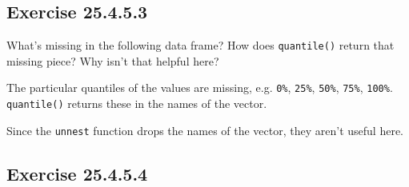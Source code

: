 \documentclass[]{book}
\newenvironment{Shaded}{\begin{snugshade}}{\end{snugshade}}
\newcommand{\CommentTok}[1]{\textcolor[rgb]{0.56,0.35,0.01}{\textit{#1}}}
\newcommand{\DataTypeTok}[1]{\textcolor[rgb]{0.13,0.29,0.53}{#1}}
\newcommand{\KeywordTok}[1]{\textcolor[rgb]{0.13,0.29,0.53}{\textbf{#1}}}
\newcommand{\NormalTok}[1]{#1}
\newcommand{\OperatorTok}[1]{\textcolor[rgb]{0.81,0.36,0.00}{\textbf{#1}}}
\newcommand{\StringTok}[1]{\textcolor[rgb]{0.31,0.60,0.02}{#1}}
\theoremstyle{plain}
\theoremstyle{remark}
\begin{document}
\hypertarget{exercise-25.4.5.3}{%
\subsection*{\texorpdfstring{Exercise
{25.4.5.3}}{Exercise 25.4.5.3}}\label{exercise-25.4.5.3}}

What's missing in the following data frame? How does \texttt{quantile()}
return that missing piece? Why isn't that helpful here?

\begin{Shaded}
\end{Shaded}

The particular quantiles of the values are missing, e.g. \texttt{0\%},
\texttt{25\%}, \texttt{50\%}, \texttt{75\%}, \texttt{100\%}.
\texttt{quantile()} returns these in the names of the vector.

\begin{Shaded}
\end{Shaded}

Since the \texttt{unnest} function drops the names of the vector, they
aren't useful here.

\hypertarget{exercise-25.4.5.4}{%
\subsection*{\texorpdfstring{Exercise
{25.4.5.4}}{Exercise 25.4.5.4}}\label{exercise-25.4.5.4}}
\end{document}

